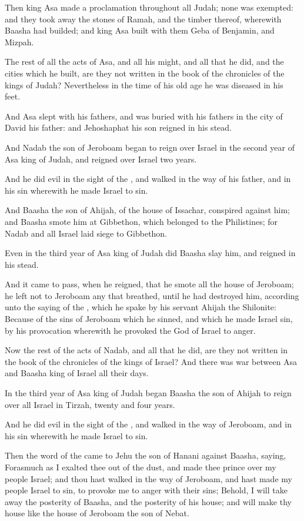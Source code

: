 \Verse Then king Asa made a proclamation throughout all Judah; none was exempted: and they took away the stones of Ramah, and the timber thereof, wherewith Baasha had builded; and king Asa built with them Geba of Benjamin, and Mizpah.

\Verse The rest of all the acts of Asa, and all his might, and all that he did, and the cities which he built, are they not written in the book of the chronicles of the kings of Judah? Nevertheless in the time of his old age he was diseased in his feet.

\Verse And Asa slept with his fathers, and was buried with his fathers in the city of David his father: and Jehoshaphat his son reigned in his stead.

\Verse And Nadab the son of Jeroboam began to reign over Israel in the second year of Asa king of Judah, and reigned over Israel two years.

\Verse And he did evil in the sight of the \LORD, and walked in the way of his father, and in his sin wherewith he made Israel to sin.

\Verse And Baasha the son of Ahijah, of the house of Issachar, conspired against him; and Baasha smote him at Gibbethon, which belonged to the Philistines; for Nadab and all Israel laid siege to Gibbethon.

\Verse Even in the third year of Asa king of Judah did Baasha slay him, and reigned in his stead.

\Verse And it came to pass, when he reigned, that he smote all the house of Jeroboam; he left not to Jeroboam any that breathed, until he had destroyed him, according unto the saying of the \LORD, which he spake by his servant Ahijah the Shilonite: \Verse Because of the sins of Jeroboam which he sinned, and which he made Israel sin, by his provocation wherewith he provoked the \LORD God of Israel to anger.

\Verse Now the rest of the acts of Nadab, and all that he did, are they not written in the book of the chronicles of the kings of Israel?  \Verse And there was war between Asa and Baasha king of Israel all their days.

\Verse In the third year of Asa king of Judah began Baasha the son of Ahijah to reign over all Israel in Tirzah, twenty and four years.

\Verse And he did evil in the sight of the \LORD, and walked in the way of Jeroboam, and in his sin wherewith he made Israel to sin.


\Chapter
\Verse Then the word of the \LORD came to Jehu the son of Hanani against Baasha, saying, \Verse Forasmuch as I exalted thee out of the dust, and made thee prince over my people Israel; and thou hast walked in the way of Jeroboam, and hast made my people Israel to sin, to provoke me to anger with their sins; \Verse Behold, I will take away the posterity of Baasha, and the posterity of his house; and will make thy house like the house of Jeroboam the son of Nebat.

